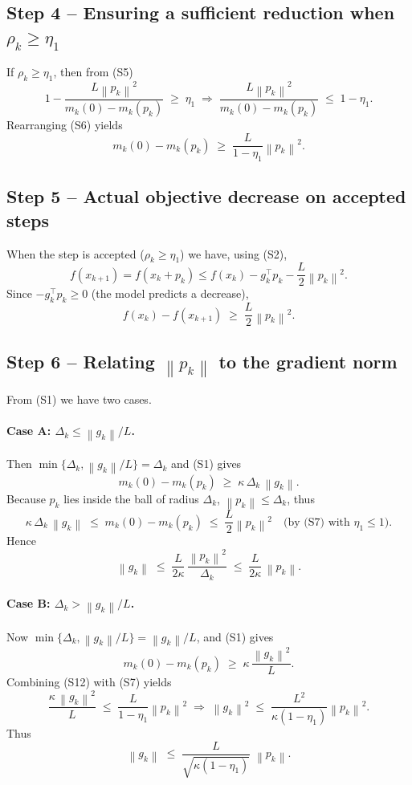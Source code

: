 \documentclass[11pt]{article}
\newcommand{\norm}[1]{\left\lVert #1\right\rVert}
\begin{document}
\subsection*{Step 4 – Ensuring a sufficient reduction when $\rho_{k}\ge\eta_{1}$}
If $\rho_{k}\ge\eta_{1}$, then from (S5)
\[
1 - \frac{L\norm{p_{k}}^{2}}
          {m_{k}(0)-m_{k}(p_{k})}
   \;\ge\;\eta_{1}
\;\Longrightarrow\;
\frac{L\norm{p_{k}}^{2}}
          {m_{k}(0)-m_{k}(p_{k})}
   \;\le\;1-\eta_{1}.
\tag{S6}
\]
Rearranging (S6) yields
\[
m_{k}(0)-m_{k}(p_{k})
   \;\ge\;\frac{L}{1-\eta_{1}}\norm{p_{k}}^{2}.
\tag{S7}
\]

\subsection*{Step 5 – Actual objective decrease on accepted steps}
When the step is accepted ($\rho_{k}\ge\eta_{1}$) we have, using (S2),
\[
f(x_{k+1}) = f(x_{k}+p_{k})
   \le f(x_{k}) - g_{k}^{\top}p_{k} - \frac{L}{2}\norm{p_{k}}^{2}.
\tag{S8}
\]
Since $-g_{k}^{\top}p_{k}\ge 0$ (the model predicts a decrease),
\[
f(x_{k})-f(x_{k+1})
   \;\ge\; \frac{L}{2}\norm{p_{k}}^{2}.
\tag{S9}
\]

\subsection*{Step 6 – Relating $\norm{p_{k}}$ to the gradient norm}
From (S1) we have two cases.

\paragraph{Case A: $\Delta_{k}\le \norm{g_{k}}/L$.}
Then $\min\{\Delta_{k},\norm{g_{k}}/L\}= \Delta_{k}$ and (S1) gives
\[
m_{k}(0)-m_{k}(p_{k})
   \;\ge\;\kappa\,\Delta_{k}\,\norm{g_{k}} .
\tag{S10}
\]
Because $p_{k}$ lies inside the ball of radius $\Delta_{k}$,
$\norm{p_{k}}\le\Delta_{k}$, thus
\[
\kappa\,\Delta_{k}\,\norm{g_{k}}
   \;\le\; m_{k}(0)-m_{k}(p_{k})
   \;\le\; \frac{L}{2}\norm{p_{k}}^{2}      \quad\text{(by (S7) with $\eta_{1}\le1$)}.
\]
Hence
\[
\norm{g_{k}} \;\le\; \frac{L}{2\kappa}\,\frac{\norm{p_{k}}^{2}}{\Delta_{k}}
   \;\le\; \frac{L}{2\kappa}\,\norm{p_{k}} .
\tag{S11}
\]

\paragraph{Case B: $\Delta_{k}> \norm{g_{k}}/L$.}
Now $\min\{\Delta_{k},\norm{g_{k}}/L\}= \norm{g_{k}}/L$, and (S1) gives
\[
m_{k}(0)-m_{k}(p_{k})
   \;\ge\;\kappa\,\frac{\norm{g_{k}}^{2}}{L}.
\tag{S12}
\]
Combining (S12) with (S7) yields
\[
\frac{\kappa\,\norm{g_{k}}^{2}}{L}
   \;\le\; \frac{L}{1-\eta_{1}}\norm{p_{k}}^{2}
   \;\Longrightarrow\;
\norm{g_{k}}^{2}
   \;\le\; \frac{L^{2}}{\kappa(1-\eta_{1})}\norm{p_{k}}^{2}.
\tag{S13}
\]
Thus
\[
\norm{g_{k}}
   \;\le\; \frac{L}{\sqrt{\kappa(1-\eta_{1})}}\;\norm{p_{k}} .
\tag{S14}
\]
\end{document}
